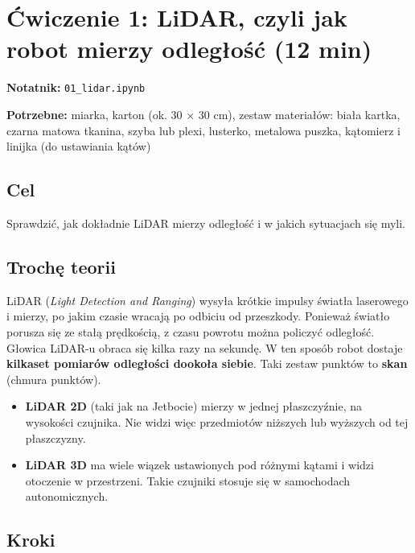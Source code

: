 \section{Ćwiczenie 1: LiDAR, czyli jak robot mierzy odległość (12 min)}\label{ux107wiczenie-1-lidar-czyli-jak-robot-mierzy-odlegux142oux15bux107-12-min}

\textbf{Notatnik:} \texttt{01\_lidar.ipynb}

\textbf{Potrzebne:} miarka, karton (ok. 30 × 30 cm), zestaw materiałów: biała kartka, czarna matowa tkanina, szyba lub plexi, lusterko, metalowa puszka, kątomierz i linijka (do ustawiania kątów)

\subsection{Cel}\label{cel}

Sprawdzić, jak dokładnie LiDAR mierzy odległość i w jakich sytuacjach się myli.

\subsection{Trochę teorii}\label{trochux119-teorii}

LiDAR (\emph{Light Detection and Ranging}) wysyła krótkie impulsy światła laserowego i mierzy, po jakim czasie wracają po odbiciu od przeszkody. Ponieważ światło porusza się ze stałą prędkością, z czasu powrotu można policzyć odległość. Głowica LiDAR-u obraca się kilka razy na sekundę. W ten sposób robot dostaje \textbf{kilkaset pomiarów odległości dookoła siebie}. Taki zestaw punktów to \textbf{skan} (chmura punktów).

\begin{itemize}
\tightlist
\item
  \textbf{LiDAR 2D} (taki jak na Jetbocie) mierzy w jednej płaszczyźnie, na wysokości czujnika. Nie widzi więc przedmiotów niższych lub wyższych od tej płaszczyzny.
\item
  \textbf{LiDAR 3D} ma wiele wiązek ustawionych pod różnymi kątami i widzi otoczenie w przestrzeni. Takie czujniki stosuje się w samochodach autonomicznych.
\end{itemize}

\subsection{Kroki}\label{kroki}

